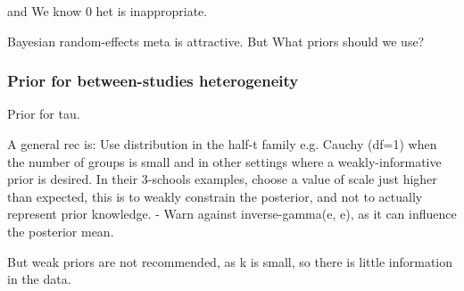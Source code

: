 and We know 0 het is inappropriate.

Bayesian random-effects meta is attractive.
But What priors should we use?

\subsubsection{Prior for between-studies heterogeneity}
Prior for tau.

A general rec is:
Use distribution in the half-t family e.g. Cauchy (df=1) when the number of groups is small and in other settings where a weakly-informative prior is desired.
In their 3-schools examples, choose a value of scale just higher than expected, this is to weakly constrain the posterior, and not to actually represent prior knowledge.
- Warn against inverse-gamma(e, e), as it can influence the posterior mean.

But weak priors are not recommended, as k is small, so there is little information in the data.

